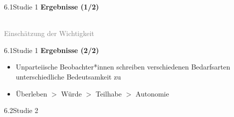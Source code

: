 \documentclass[xcolor=table,9pt,aspectratio=169]{beamer}
\begin{document}
\begin{frame}{\vspace*{10mm}6.1\hspace*{1em}Studie 1}
\textbf{Ergebnisse (1/2)}\\
\bigskip
\begin{center}
   \\
   \footnotesize{\textcolor{gray}{Einschätzung der Wichtigkeit}}
\end{center}
\end{frame}


\begin{frame}{\vspace*{10mm}6.1\hspace*{1em}Studie 1}
\textbf{Ergebnisse (2/2)}\\
\begin{itemize}
   \item Unparteiische Beobachter*innen schreiben verschiedenen Bedarfsarten unterschiedliche Bedeutsamkeit zu
   \item Überleben $>$ Würde $>$ Teilhabe $>$ Autonomie
\end{itemize}
\end{frame}


\begin{frame}
\begin{overlayarea}{\textwidth}{0.81\paperheight}{
   \vspace*{11mm}
   \textcolor{uolblue}
   {6.2\hspace*{1em}Studie 2}
}
\end{overlayarea}
\end{frame}
\end{document}
